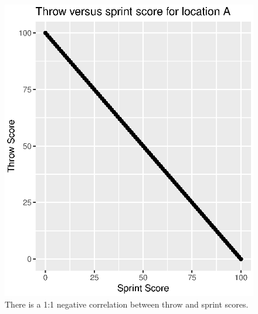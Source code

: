 \documentclass[runningheads]{llncs}
\begin{document}
\begin{figure}[h!]
\begin{multicols}{2}
    \includegraphics[width=\linewidth]{throwSprintLocA.eps} \vspace{-0.7cm} \caption{There is a 1:1 negative correlation between throw and sprint scores.} \label{throwSprintLocA} \par
\end{multicols} 
\end{figure}
\end{document}
